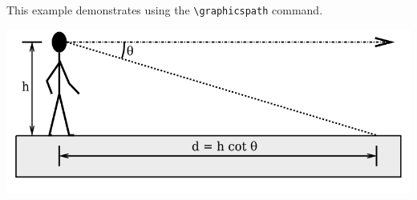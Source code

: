 \documentclass[letterpaper,12pt]{article}
\begin{document}
This example demonstrates using the \verb#\graphicspath# command.

\includegraphics[width=\textwidth]{angle-of-decl}
\end{document}

